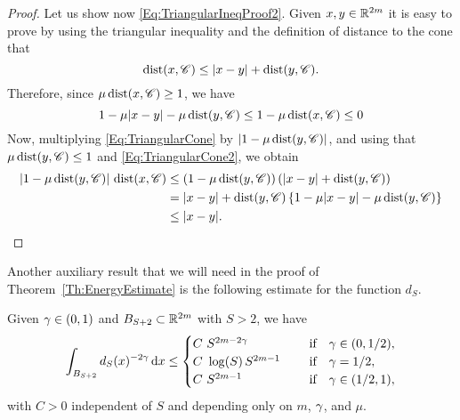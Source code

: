 \begin{proof}
Let us show now \eqref{Eq:TriangularIneqProof2}. Given $x,y \in \mathbb{R}^{2m}$ it is easy to prove by using the triangular inequality and the definition of distance to the cone that
\begin{equation} 
\label{Eq:TriangularCone}
\operatorname{dist}(x,\mathscr{C}) \leq |x-y| + \operatorname{dist}(y,\mathscr{C}).
\end{equation}
Therefore, since $\mu \operatorname{dist}(x,\mathscr{C})\geq 1$, we have
\begin{equation} 
\label{Eq:TriangularCone2}
1-\mu |x-y|- \mu \operatorname{dist}(y,\mathscr{C}) \leq 1-\mu\operatorname{dist}(x,\mathscr{C}) \leq 0
\end{equation}
Now, multiplying \eqref{Eq:TriangularCone} by $|1-\mu\operatorname{dist}(y,\mathscr{C})|$, and using that $\mu \operatorname{dist}(y,\mathscr{C})\leq 1$ and \eqref{Eq:TriangularCone2}, we obtain
\begin{align*}
|1-\mu\operatorname{dist}(y,\mathscr{C})|\,\operatorname{dist}(x,\mathscr{C}) &\leq (1-\mu\operatorname{dist}(y,\mathscr{C})) \left(|x-y| + \operatorname{dist}(y,\mathscr{C})\right) \\
&= |x-y|+\operatorname{dist}(y,\mathscr{C}) \left\{ 1 -\mu |x-y|- \mu \operatorname{dist}(y,\mathscr{C}) \right\} \\
&\leq |x-y|.
\end{align*}
\end{proof}

Another auxiliary result that we will need in the proof of Theorem~\ref{Th:EnergyEstimate} is the following estimate for the function $d_S$. 

\begin{lemma}
\label{Lemma:Integrability_dFunction}
Given $\gamma \in (0,1)$ and $B_{S+2}\subset \mathbb{R}^{2m}$ with $S>2$, we have
$$ \int_{B_{S+2}} d_S(x)^{-2\gamma} \,\mathrm{d} x \leq \begin{cases}
C \ S^{2m-2\gamma}\ \ \ \ &\textrm{if } \ \ \gamma\in(0,1/2),\\
C\ \log(S)\,S^{2m-1}\ \ \ \ &\textrm{if } \ \ \gamma=1/2,\\
C \ S^{2m-1}\ \ \ \ &\textrm{if } \ \ \gamma\in(1/2,1),\\
\end{cases} $$
with $C>0$ independent of $S$ and depending only on $m$, $\gamma$, and $\mu$.
\end{lemma}


